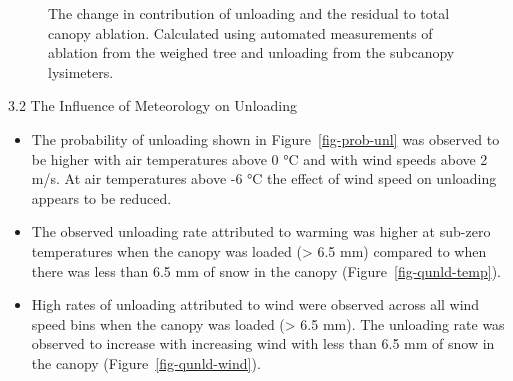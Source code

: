\documentclass[
  letterpaper,
  DIV=11,
  numbers=noendperiod]{scrartcl}
\begin{document}
\begin{figure}

\begin{minipage}{0.50\linewidth}


\subcaption{\label{fig-c-abl-temp}}

\end{minipage}%
%
\begin{minipage}{0.50\linewidth}


\subcaption{\label{fig-c-abl-wind}}

\end{minipage}%

\caption{\label{fig-c-abl-met}The change in contribution of unloading
and the residual to total canopy ablation. Calculated using automated
measurements of ablation from the weighed tree and unloading from the
subcanopy lysimeters.}

\end{figure}%

3.2 The Influence of Meteorology on Unloading

\begin{itemize}
\item
  The probability of unloading shown in Figure~\ref{fig-prob-unl} was
  observed to be higher with air temperatures above 0 °C and with wind
  speeds above 2 m/s. At air temperatures above -6 °C the effect of wind
  speed on unloading appears to be reduced.
\item
  The observed unloading rate attributed to warming was higher at
  sub-zero temperatures when the canopy was loaded (\textgreater{} 6.5
  mm) compared to when there was less than 6.5 mm of snow in the canopy
  (Figure~\ref{fig-qunld-temp}).
\item
  High rates of unloading attributed to wind were observed across all
  wind speed bins when the canopy was loaded (\textgreater{} 6.5 mm).
  The unloading rate was observed to increase with increasing wind with
  less than 6.5 mm of snow in the canopy (Figure~\ref{fig-qunld-wind}).
\end{itemize}
\end{document}

